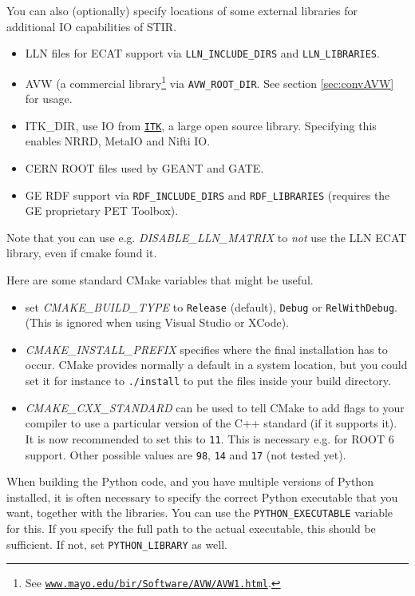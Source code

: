 \documentclass{article}
\def\url#1#2{\mbox{\href{#1}{\tt #2}}}
\begin{document}
You can also (optionally) specify locations of some external libraries for additional IO
capabilities of STIR. 
\begin{itemize}
\item LLN files for ECAT support via \texttt{LLN\_INCLUDE\_DIRS} and \texttt{LLN\_LIBRARIES}.
\item AVW\texttrademark{} (a commercial library\footnote{See \url{http://www.mayo.edu/bir/Software/AVW/AVW1.html}
{www.mayo.edu/bir/Software/AVW/AVW1.html}.}
via \texttt{AVW\_ROOT\_DIR}. See section \ref{sec:convAVW} for usage.
\item ITK\_DIR, use IO from \url{http://www.itk.org}{ITK}, a large open source library. Specifying this
 enables NRRD, MetaIO and Nifti IO.
\item CERN ROOT files used by GEANT and GATE.
\item GE RDF\texttrademark{} support via \texttt{RDF\_INCLUDE\_DIRS} and \texttt{RDF\_LIBRARIES} (requires the GE proprietary PET Toolbox).
\end{itemize}

Note that you can use e.g. \textit{DISABLE\_LLN\_MATRIX} to \textit{not}
use the LLN ECAT library, even if cmake found it.

Here are some standard CMake variables that might be useful.
\begin{itemize}
\item set \textit{CMAKE\_BUILD\_TYPE} to \texttt{Release} (default), \texttt{Debug} or \texttt{RelWithDebug}.
(This is ignored when using Visual Studio or XCode).
\item \textit{CMAKE\_INSTALL\_PREFIX} specifies where the final installation has to occur. CMake
provides normally a default in a system location, but you could set it for instance to
\texttt{./install} to put the files inside your build directory.
\item \textit{CMAKE\_CXX\_STANDARD} can be used to tell CMake to add flags to your compiler to use
a particular version of the C++ standard (if it supports it). It is now recommended to set 
this to \texttt{11}. This is necessary e.g. for ROOT 6 support. Other possible values are
\texttt{98}, \texttt{14} and \texttt{17} (not tested yet).
\end{itemize}

When building the Python code, and you have multiple versions of Python installed,
it is often necessary to specify the correct Python executable that you want, together with
the libraries. You can use the \texttt{PYTHON\_EXECUTABLE} variable for this. If you
specify the full path to the actual executable, this should be sufficient. If not, set
\texttt{PYTHON\_LIBRARY} as well.
\end{document}
